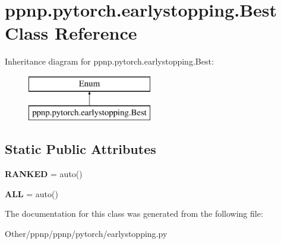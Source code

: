 \hypertarget{classppnp_1_1pytorch_1_1earlystopping_1_1Best}{}\section{ppnp.\+pytorch.\+earlystopping.\+Best Class Reference}
\label{classppnp_1_1pytorch_1_1earlystopping_1_1Best}
Inheritance diagram for ppnp.\+pytorch.\+earlystopping.\+Best\+:\begin{figure}[H]
\begin{center}
\leavevmode
\includegraphics[height=2.000000cm]{classppnp_1_1pytorch_1_1earlystopping_1_1Best}
\end{center}
\end{figure}
\subsection*{Static Public Attributes}
\begin{DoxyCompactItemize}
\item 
\mbox{\label{classppnp_1_1pytorch_1_1earlystopping_1_1Best_ae47227a70b52c81e521ad34a1ce2b26c}} 
{\bfseries R\+A\+N\+K\+ED} = auto()
\item 
\mbox{\label{classppnp_1_1pytorch_1_1earlystopping_1_1Best_aa76ab4bb7b5ac6fe3808a74f4159d67c}} 
{\bfseries A\+LL} = auto()
\end{DoxyCompactItemize}


The documentation for this class was generated from the following file\+:\begin{DoxyCompactItemize}
\item 
Other/ppnp/ppnp/pytorch/earlystopping.\+py\end{DoxyCompactItemize}
